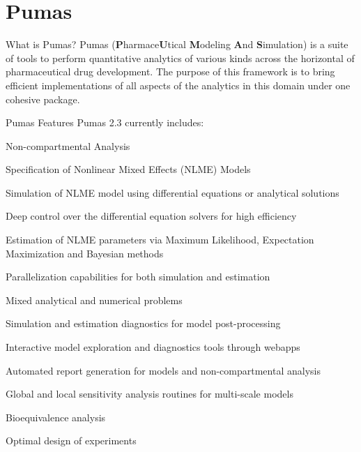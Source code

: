 \section{Pumas}
\begin{frame}{What is Pumas?}
    Pumas (\textbf{P}harmace\textbf{U}tical \textbf{M}odeling \textbf{A}nd \textbf{S}imulation)
    \parencite{rackauckas2020accelerated}
    is a suite of tools to perform quantitative analytics of various kinds
    across the horizontal of pharmaceutical drug development.
    The purpose of this framework is to bring efficient implementations of
    all aspects of the analytics in this domain under one cohesive package.
\end{frame}

\begin{frame}{Pumas Features}
    Pumas 2.3 currently includes:
    \begin{vfilleditems}
        \small
        \item Non-compartmental Analysis
        \item Specification of Nonlinear Mixed Effects (NLME) Models
        \item Simulation of NLME model using differential equations or analytical solutions
        \item Deep control over the differential equation solvers for high efficiency
        \item Estimation of NLME parameters via Maximum Likelihood, Expectation Maximization and Bayesian methods
        \item Parallelization capabilities for both simulation and estimation
        \item Mixed analytical and numerical problems
        \item Simulation and estimation diagnostics for model post-processing
        \item Interactive model exploration and diagnostics tools through webapps
        \item Automated report generation for models and non-compartmental analysis
        \item Global and local sensitivity analysis routines for multi-scale models
        \item Bioequivalence analysis
        \item Optimal design of experiments
    \end{vfilleditems}
\end{frame}